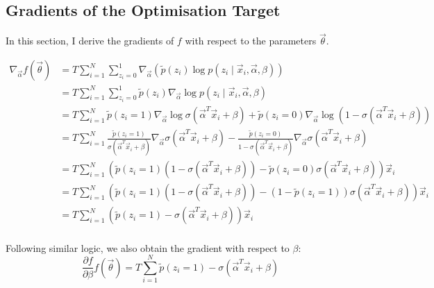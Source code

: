     \newpage
    \subsection{Gradients of the Optimisation Target}

        In this section, I derive the gradients of $f$ with respect to the parameters $\vec \theta$.

        \begin{align*}
            \nabla_{\vec \alpha} f(\vec \theta) &= T \sum_{i = 1}^N \sum_{z_i = 0}^1 \nabla_{\vec \alpha} (\tilde p(z_i) \log p(z_i \mid \vec x_i, \vec \alpha, \beta))\\
                &= T \sum_{i = 1}^N \sum_{z_i = 0}^1 \tilde p(z_i) \nabla_{\vec \alpha} \log p(z_i \mid \vec x_i, \vec \alpha, \beta)\\
                &= T \sum_{i = 1}^N \tilde p(z_i = 1) \nabla_{\vec \alpha} \log \sigma(\vec \alpha^T \vec x_i + \beta) + \tilde p(z_i = 0) \nabla_{\vec \alpha} \log (1 - \sigma(\vec \alpha^T \vec x_i + \beta))\\
                &= T \sum_{i = 1}^N \frac{\tilde p(z_i = 1)}{\sigma(\vec \alpha^T \vec x_i + \beta)} \nabla_{\vec \alpha} \sigma(\vec \alpha^T \vec x_i + \beta) - \frac{\tilde p(z_i = 0)}{1 - \sigma(\vec \alpha^T \vec x_i + \beta)} \nabla_{\vec \alpha} \sigma(\vec \alpha^T \vec x_i + \beta)\\
                &= T \sum_{i = 1}^N \left(\tilde p(z_i = 1) (1 - \sigma(\vec \alpha^T \vec x_i + \beta)) - \tilde p(z_i = 0) \sigma(\vec \alpha^T \vec x_i + \beta)\right) \vec x_i\\
                &= T \sum_{i = 1}^N \left(\tilde p(z_i = 1) (1 - \sigma(\vec \alpha^T \vec x_i + \beta)) - (1 - \tilde p(z_i = 1)) \sigma(\vec \alpha^T \vec x_i + \beta)\right) \vec x_i\\
                &= T \sum_{i = 1}^N \left(\tilde p(z_i = 1) - \sigma(\vec \alpha^T \vec x_i + \beta)\right) \vec x_i\\
        \end{align*}

        Following similar logic, we also obtain the gradient with respect to $\beta$:
        \[
            \frac{\partial f}{\partial \beta} f(\vec \theta) = T \sum_{i = 1}^N \tilde p(z_i = 1) - \sigma(\vec \alpha^T \vec x_i + \beta)
        \]

  
